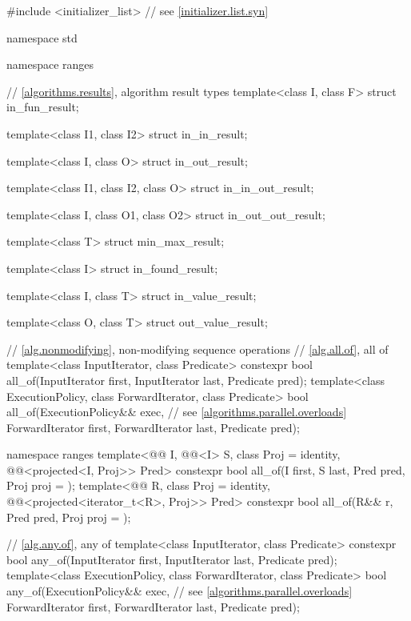 \begin{codeblock}
#include <initializer_list>     // see \ref{initializer.list.syn}

namespace std {
  namespace ranges {
    // \ref{algorithms.results}, algorithm result types
    template<class I, class F>
      struct in_fun_result;

    template<class I1, class I2>
      struct in_in_result;

    template<class I, class O>
      struct in_out_result;

    template<class I1, class I2, class O>
      struct in_in_out_result;

    template<class I, class O1, class O2>
      struct in_out_out_result;

    template<class T>
      struct min_max_result;

    template<class I>
      struct in_found_result;

    template<class I, class T>
      struct in_value_result;

    template<class O, class T>
      struct out_value_result;
  }

  // \ref{alg.nonmodifying}, non-modifying sequence operations
  // \ref{alg.all.of}, all of
  template<class InputIterator, class Predicate>
    constexpr bool all_of(InputIterator first, InputIterator last, Predicate pred);
  template<class ExecutionPolicy, class ForwardIterator, class Predicate>
    bool all_of(ExecutionPolicy&& exec,                         // see \ref{algorithms.parallel.overloads}
                ForwardIterator first, ForwardIterator last, Predicate pred);

  namespace ranges {
    template<@@ I, @@<I> S, class Proj = identity,
             @@<projected<I, Proj>> Pred>
      constexpr bool all_of(I first, S last, Pred pred, Proj proj = {});
    template<@@ R, class Proj = identity,
             @@<projected<iterator_t<R>, Proj>> Pred>
      constexpr bool all_of(R&& r, Pred pred, Proj proj = {});
  }

  // \ref{alg.any.of}, any of
  template<class InputIterator, class Predicate>
    constexpr bool any_of(InputIterator first, InputIterator last, Predicate pred);
  template<class ExecutionPolicy, class ForwardIterator, class Predicate>
    bool any_of(ExecutionPolicy&& exec,                         // see \ref{algorithms.parallel.overloads}
                ForwardIterator first, ForwardIterator last, Predicate pred);

}
\end{codeblock}
